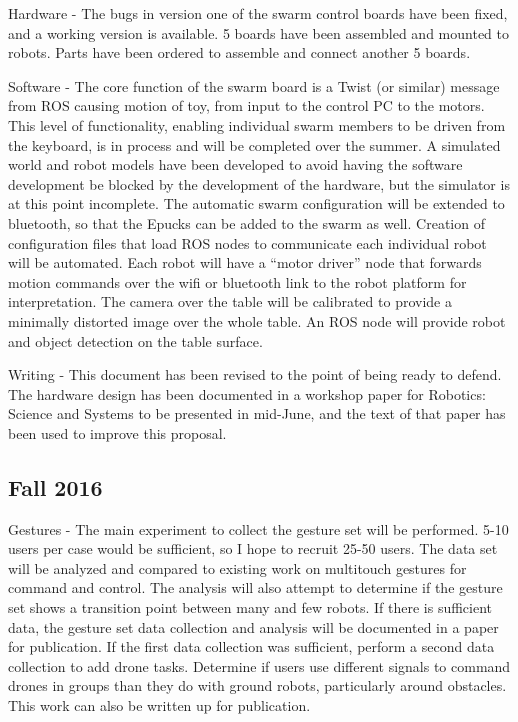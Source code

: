 \documentclass[]{article}
\begin{document}
Hardware - The bugs in version one of the swarm control boards have been fixed, and a working version is available. 
5 boards have been assembled and mounted to robots. 
Parts have been ordered to assemble and connect another 5 boards.  

Software - The core function of the swarm board is a Twist (or similar) message from ROS causing motion of toy, from input to the control PC to the motors. 
This level of functionality, enabling individual swarm members to be driven from the keyboard, is in process and will be completed over the summer. 
A simulated world and robot models have been developed to avoid having the software development be blocked by the development of the hardware, but the simulator is at this point incomplete. 
The automatic swarm configuration will be extended to bluetooth, so that the Epucks can be added to the swarm as well. 
Creation of configuration files that load ROS nodes to communicate each individual robot will be automated. 
Each robot will have a ``motor driver'' node that forwards motion commands over the wifi or bluetooth link to the robot platform for interpretation. 
The camera over the table will be calibrated to provide a minimally distorted image over the whole table. 
An ROS node will provide robot and object detection on the table surface. 

Writing - This document has been revised to the point of being ready to defend. 
The hardware design has been documented in a workshop paper for Robotics: Science and Systems to be presented in mid-June, and the text of that paper has been used to improve this proposal. 

\subsection{Fall 2016}

Gestures - The main experiment to collect the gesture set will be performed. 
5-10 users per case would be sufficient, so I hope to recruit 25-50 users. 
The data set will be analyzed and compared to existing work on multitouch gestures for command and control. 
The analysis will also attempt to determine if the gesture set shows a transition point between many and few robots. 
If there is sufficient data, the gesture set data collection and analysis will be documented in a paper for publication. 
If the first data collection was sufficient, perform a second data collection to add drone tasks. 
Determine if users use different signals to command drones in groups than they do with ground robots, particularly around obstacles. 
This work can also be written up for publication. 
\end{document}
